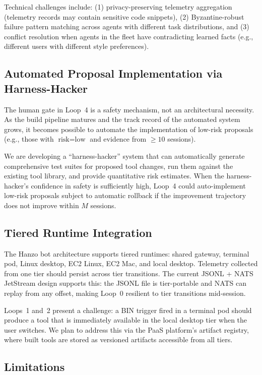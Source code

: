 Technical challenges include: (1) privacy-preserving telemetry aggregation
(telemetry records may contain sensitive code snippets), (2) Byzantine-robust
failure pattern matching across agents with different task distributions, and
(3) conflict resolution when agents in the fleet have contradicting learned
facts (e.g., different users with different style preferences).

\subsection{Automated Proposal Implementation via Harness-Hacker}

The human gate in Loop~4 is a safety mechanism, not an architectural necessity.
As the build pipeline matures and the track record of the automated system
grows, it becomes possible to automate the implementation of low-risk proposals
(e.g., those with $\text{risk} = \text{low}$ and evidence from $\geq 10$
sessions).

We are developing a ``harness-hacker'' system that can automatically generate
comprehensive test suites for proposed tool changes, run them against the
existing tool library, and provide quantitative risk estimates. When the
harness-hacker's confidence in safety is sufficiently high, Loop~4 could
auto-implement low-risk proposals subject to automatic rollback if the
improvement trajectory does not improve within $M$ sessions.

\subsection{Tiered Runtime Integration}

The Hanzo bot architecture supports tiered runtimes: shared gateway, terminal
pod, Linux desktop, EC2 Linux, EC2 Mac, and local desktop. Telemetry collected
from one tier should persist across tier transitions. The current JSONL +
NATS JetStream design supports this: the JSONL file is tier-portable and
NATS can replay from any offset, making Loop~0 resilient to tier transitions
mid-session.

Loops~1 and~2 present a challenge: a BIN trigger fired in a terminal pod
should produce a tool that is immediately available in the local desktop tier
when the user switches. We plan to address this via the PaaS platform's
artifact registry, where built tools are stored as versioned artifacts
accessible from all tiers.

\subsection{Limitations}

